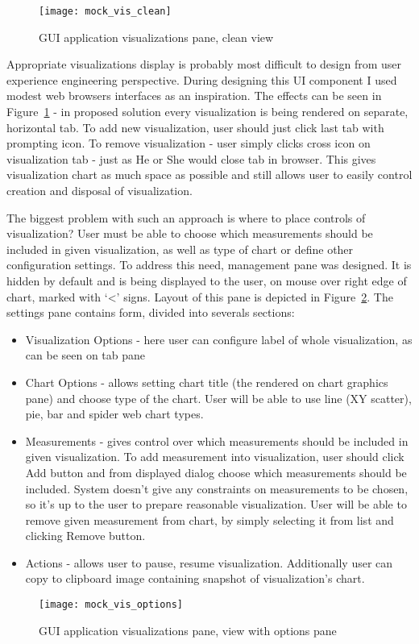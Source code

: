 \begin{figure}[ht]
\centering
\texttt{[image: mock\_vis\_clean]}
\caption{GUI application visualizations pane, clean view}
\label{fig:mock_vis_clean}
\end{figure}

Appropriate visualizations display is probably most difficult to design from user experience engineering perspective. During designing this UI component I used modest web browsers interfaces as an inspiration. The effects can be seen in Figure~\ref{fig:mock_vis_clean} - in proposed solution every visualization is being rendered on separate, horizontal tab. To add new visualization, user should just click last tab with prompting icon. To remove visualization - user simply clicks cross icon on visualization tab - just as He or She would close tab in browser. This gives visualization chart as much space as possible and still allows user to easily control creation and disposal of visualization.

The biggest problem with such an approach is where to place controls of visualization? User must be able to choose which measurements should be included in given visualization, as well as type of chart or define other configuration settings. To address this need, management pane was designed. It is hidden by default and is being displayed to the user, on mouse over right edge of chart, marked with \lq{}<\rq{} signs. Layout of this pane is depicted in Figure~\ref{fig:mock_vis_options}. The settings pane contains form, divided into severals sections:

\begin{itemize}

\item Visualization Options - here user can configure label of whole visualization, as can be seen on tab pane

\item Chart Options - allows setting chart title (the rendered on chart graphics pane) and choose type of the chart. User will be able to use line (XY scatter), pie, bar and spider web chart types.

\item Measurements - gives control over which measurements should be included in given visualization. To add measurement into visualization, user should click Add button and from displayed dialog choose which measurements should be included. System doesn't give any constraints on measurements to be chosen, so it's up to the user to prepare reasonable visualization. User will be able to remove given measurement from chart, by simply selecting it from list and clicking Remove button.

\item Actions - allows user to pause, resume visualization. Additionally user can copy to clipboard image containing snapshot of visualization's chart.
\end{itemize}

\begin{figure}[ht]
\centering
\texttt{[image: mock\_vis\_options]}
\caption{GUI application visualizations pane, view with options pane}
\label{fig:mock_vis_options}
\end{figure}


